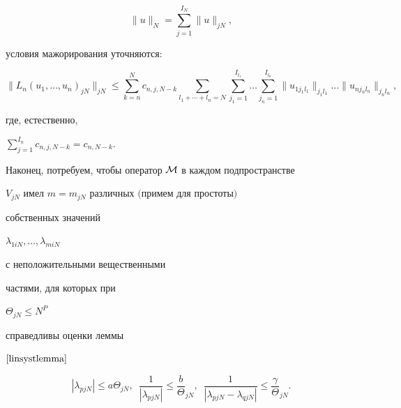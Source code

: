 \begin{thm}
$$




\|u\|_N=\sum\limits_{j=1}^{ I_N} \|u\|_{jN},




$$


условия мажорирования уточняются$:$


$$






\|L_n(u_1,\dotsc,u_n)_{jN}\|_{jN}\leq


\sum\limits_{k=n}^{N}c_{n,j,N-k}\sum\limits_{l_1+\dotsb+l_n=N}


\sum\limits_{j_1=1}^{I_{l_1}}


\dotsc


\sum\limits_{j_n=1}^{I_{l_n}}


\|u_{1j_1l_1}\|_{j_1l_1}


\dotsc


\|u_{nj_nl_n}\|_{j_nl_n},




$$


где, естественно,


$\sum\limits_{j=1}^{I_{n}} c_{n,j,N-k} = c_{n,N-k}$.


Наконец, потребуем, чтобы оператор ${\cal{M}}$ в каждом подпространстве


$V_{jN}$ имел $m=m_{jN}$ различных $($примем для простоты$)$


собственных значений


$\lambda_{1iN}, \dotsc, \lambda_{miN}$


с неположительными вещественными


частями, для которых при


$\Theta_{jN} \leq N^P$


справедливы оценки леммы


$\ref{linsystlemma}$


\begin{equation}


\label{abgamma}


|\lambda_{pjN}|\leq a\Theta_{jN}, \ \;


\frac{1}{|\lambda_{pjN}|}\leq \frac{b}{\Theta}_{jN},\ \;


\frac{1}{|\lambda_{pjN}-\lambda_{qjN}|}\leq \frac{\gamma}{\Theta}_{jN}.



\end{equation}
\end{thm}
